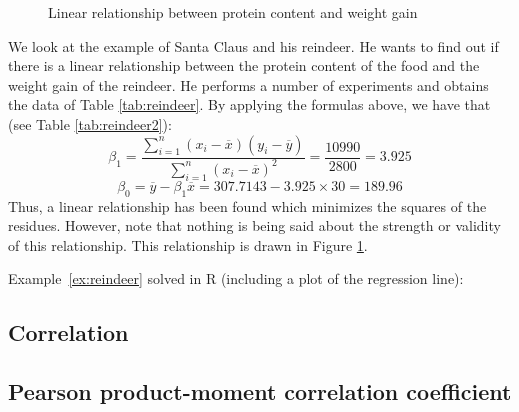 \begin{figure}

  \caption{Linear relationship between protein content and weight gain}
  \label{fig:reindeerFigure}
\end{figure}

\begin{example}
  \label{ex:reindeer}
  We look at the example of Santa Claus and his reindeer. He wants to find out if there is a linear relationship between the protein content of the food and the weight gain of the reindeer. He performs a number of experiments and obtains the data of Table \ref{tab:reindeer}. By applying the formulas above, we have that (see Table \ref{tab:reindeer2}):
  \[ \beta_{1} = \frac{\sum_{i=1}^{n} (x_{i}-\overline{x})(y_{i} - \overline{y})}{\sum_{i=1}^{n} (x_{i}-\overline{x})^{2}} = \frac{10990}{2800} = 3.925 \]
  \[ \beta_{0} = \overline{y} - \beta_{1} \overline{x} = 307.7143 - 3.925 \times 30 = 189.96 \]
  Thus, a linear relationship has been found which minimizes the squares of the residues. However, note that nothing is being said about the strength or validity of this relationship. This relationship is drawn in Figure \ref{fig:reindeerFigure}.
\end{example}

Example~\ref{ex:reindeer} solved in R (including a plot of the regression line):



\subsection{Correlation}
\label{sec:correlation}

\subsection{Pearson product-moment correlation coefficient}

